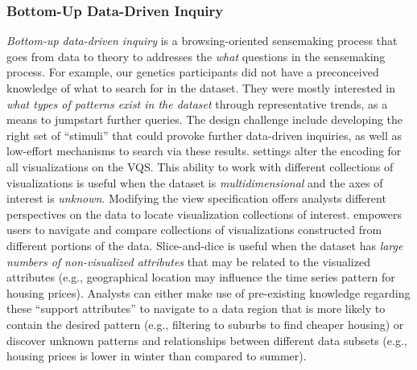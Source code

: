 {  \subsubsection{Bottom-Up Data-Driven Inquiry}
  \textit{Bottom-up data-driven inquiry} is a browsing-oriented sensemaking process that goes from data to theory to
  addresses the \textit{what} questions in the sensemaking process. For example, our genetics participants did not have a preconceived knowledge of what to search for in the dataset. They were mostly interested in \textit{what types of patterns exist in the dataset} through representative trends, as a means to jumpstart further queries. %
  The design challenge include developing the right set of ``stimuli'' that could provoke further data-driven inquiries, as well as low-effort mechanisms to search via these results.
   settings alter the encoding for all visualizations on the VQS. This ability to work with different collections of visualizations is useful when the dataset is \emph{multidimensional} and the axes of interest is \emph{unknown}. Modifying the view specification offers analysts different perspectives on the data to locate visualization collections of interest.
   empowers users to navigate and compare collections of visualizations constructed from different portions of the data. Slice-and-dice is useful when the dataset has \emph{large numbers of non-visualized attributes} that may be related to the visualized attributes (e.g., geographical location may influence the time series pattern for housing prices). Analysts can either make use of pre-existing knowledge regarding these ``support attributes'' to navigate to a data region that is more likely to contain the desired pattern (e.g., filtering to suburbs to find cheaper housing) or discover unknown patterns and relationships between different data subsets (e.g., housing prices is lower in winter than compared to summer).%

}
